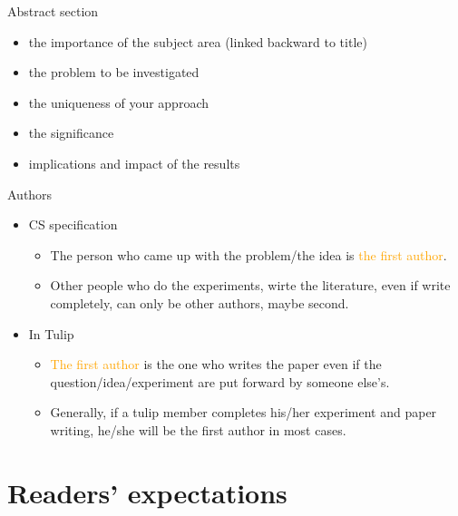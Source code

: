 \documentclass[
 size=14pt,
 paper=smartboard,  %
 mode=present, 		%
 display=slides, 	%
 style=tuliplab,  	%
 pauseslide,
 fleqn,leqno]{powerdot}{}
\begin{document}

\begin{slide}[toc=,bm=]{Abstract section}
	\begin{itemize}
		\item the importance of the subject area (linked backward to title)
		\item the problem to be investigated
		\item the uniqueness of your approach 
		\item the significance
		\item implications and impact of the results
	\end{itemize}	
\end{slide}


\begin{slide}[toc=,bm=]{Authors}
	\begin{itemize}
		\item CS specification
			\begin{itemize}
				\item The person who came up with the problem/the idea is \textcolor{orange}{the first author}. 
				\item Other people who do the experiments, wirte the literature, even if write completely, can only be other authors, maybe second.
			\end{itemize}
		\item In Tulip
			\begin{itemize}
				\item \textcolor{orange}{The first author} is the one who writes the paper even if the question/idea/experiment are put forward by someone else's.
				\item Generally, if a tulip member completes his/her experiment and paper writing, he/she will be the first author in most cases.
			\end{itemize}
	\end{itemize}	
\end{slide}


\section{Readers' expectations}
\end{document}
